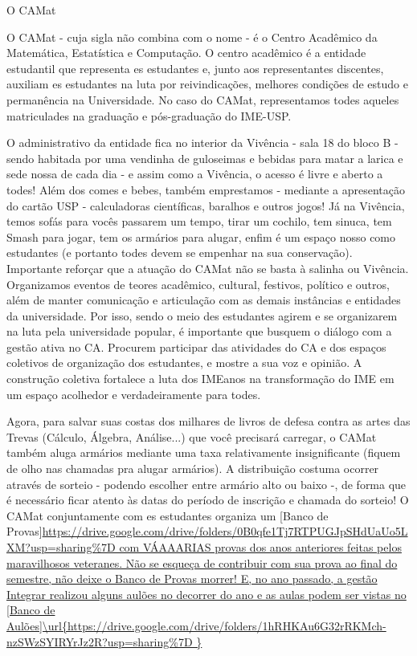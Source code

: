 \begin{secao}{O CAMat}

O CAMat - cuja sigla não combina com o nome - é o Centro Acadêmico da
Matemática, Estatística e Computação.  O centro acadêmico é a entidade
estudantil que representa es estudantes e, junto aos representantes discentes, 
auxiliam es estudantes na luta por reivindicações, melhores condições de estudo 
e permanência na Universidade. No caso do CAMat, representamos todes aqueles 
matriculades na graduação e pós-graduação do IME-USP.

O administrativo da entidade fica no interior da Vivência -  sala 18 do bloco B - sendo habitada
por uma vendinha de guloseimas e bebidas para matar a larica e sede nossa de
cada dia - e assim como a Vivência, o acesso é livre e aberto a todes! Além dos
comes e bebes, também emprestamos - mediante a apresentação do cartão USP -
calculadoras científicas, baralhos e outros jogos! Já na Vivência, temos sofás
para vocês passarem um tempo, tirar um cochilo, tem sinuca, tem Smash para jogar,
tem os armários para alugar, enfim é um espaço nosso como estudantes (e portanto 
todes devem se empenhar na sua conservação). 
Importante reforçar que a atuação do CAMat não se basta à salinha ou Vivência. Organizamos 
eventos de teores acadêmico, cultural, festivos, político e outros, além de manter comunicação 
e articulação com as demais instâncias e entidades da universidade. Por isso, sendo o meio des 
estudantes agirem e se organizarem na luta pela universidade popular, é importante que busquem 
o diálogo com a gestão ativa no CA. Procurem participar das atividades do CA e dos espaços coletivos 
de organização dos estudantes, e mostre a sua voz e opinião. A construção coletiva fortalece a luta 
dos IMEanos na transformação do IME em um espaço acolhedor e verdadeiramente para todes.

Agora, para salvar suas costas dos milhares de livros de defesa contra as artes
das Trevas (Cálculo, Álgebra, Análise...) que você precisará carregar, o CAMat 
também aluga armários mediante uma taxa relativamente insignificante (fiquem de olho 
nas chamadas pra alugar armários). A distribuição costuma ocorrer através de sorteio - 
podendo escolher entre armário alto ou baixo -, de forma que é necessário ficar atento 
às datas do período de inscrição e chamada do sorteio!
O CAMat conjuntamente com es estudantes organiza um
[Banco de Provas]\url{https://drive.google.com/drive/folders/0B0qfe1Tj7RTPUGJpSHdUaUo5LXM?usp=sharing%
com VÁAAARIAS provas dos anos anteriores feitas pelos maravilhosos veteranes.
Não se esqueça de contribuir com sua prova ao final do semestre, não
deixe o Banco de Provas morrer! E, no ano passado, a gestão Integrar realizou alguns aulões no decorrer 
do ano e as aulas podem ser vistas no [Banco de Aulões]\url{https://drive.google.com/drive/folders/1hRHKAu6G32rRKMch-nzSWzSYIRYrJz2R?usp=sharing%

}}
\end{secao}
